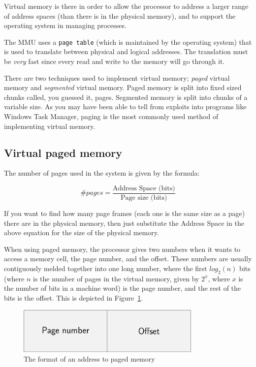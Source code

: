 Virtual memory is there in order to allow the processor to address a larger
range of address spaces (than there is in the physical memory), and to support
the operating system in managing processes.

The MMU uses a \texttt{page table} (which is maintained by the operating system)
that is used to translate between physical and logical addresses. The
translation must be \textit{very} fast since every read and write to the memory
will go through it.

There are two techniques used to implement virtual memory; \textit{paged}
virtual memory and \textit{segmented} virtual memory. Paged memory is split into
fixed sized chunks called, you guessed it, pages. Segmented memory is split into
chunks of a variable size. As you may have been able to tell from exploits into
programs like Windows Task Manager, paging is the most commonly used method of
implementing virtual memory.

\subsection{Virtual paged memory}

The number of pages used in the system is given by the formula:

\[
	\#pages = \frac{\text{Address Space (bits)}}{\text{Page size (bits)}}
\]

If you want to find how many page frames (each one is the same size as a page)
there are in the physical memory, then just substitute the Address Space in the
above equation for the size of the physical memory.

When using paged memory, the processor gives two numbers when it wants to access
a memory cell, the page number, and the offset. These numbers are usually
contiguously melded together into one long number, where the first $log_2(n)$
bits (where $n$ is the number of pages in the virtual memory, given by $2^x$,
where $x$ is the number of bits in a machine word) is the page number, and the
rest of the bits is the offset. This is depicted in Figure~\ref{memory-address}.

\begin{figure}[ht!]
  \centering
  \includegraphics[width=90mm]{diagrams/memory-address.pdf}
  \caption{The format of an address to paged memory}
  \label{memory-address}
\end{figure}

